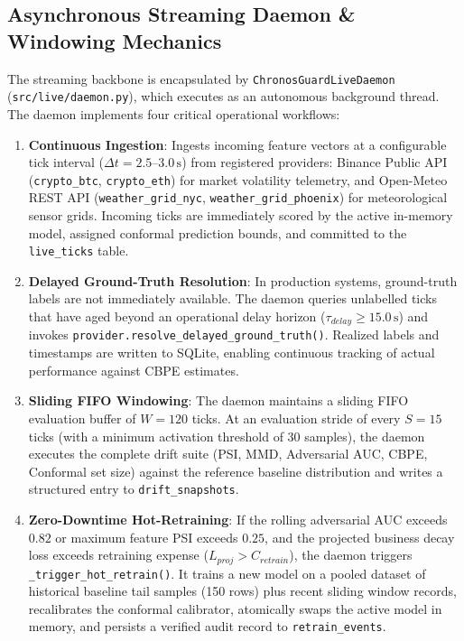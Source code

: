 \documentclass[conference]{IEEEtran}
\begin{document}
\subsection{Asynchronous Streaming Daemon \& Windowing Mechanics}
The streaming backbone is encapsulated by \texttt{ChronosGuardLiveDaemon} (\texttt{src/live/daemon.py}), which executes as an autonomous background thread. The daemon implements four critical operational workflows:
\begin{enumerate}
    \item \textbf{Continuous Ingestion}: Ingests incoming feature vectors at a configurable tick interval ($\Delta t = 2.5\text{--}3.0\,\text{s}$) from registered providers: Binance Public API (\texttt{crypto\_btc}, \texttt{crypto\_eth}) for market volatility telemetry, and Open-Meteo REST API (\texttt{weather\_grid\_nyc}, \texttt{weather\_grid\_phoenix}) for meteorological sensor grids. Incoming ticks are immediately scored by the active in-memory model, assigned conformal prediction bounds, and committed to the \texttt{live\_ticks} table.
    \item \textbf{Delayed Ground-Truth Resolution}: In production systems, ground-truth labels are not immediately available. The daemon queries unlabelled ticks that have aged beyond an operational delay horizon ($\tau_{delay} \ge 15.0\,\text{s}$) and invokes \texttt{provider.resolve\_delayed\_ground\_truth()}. Realized labels and timestamps are written to SQLite, enabling continuous tracking of actual performance against CBPE estimates.
    \item \textbf{Sliding FIFO Windowing}: The daemon maintains a sliding FIFO evaluation buffer of $W = 120$ ticks. At an evaluation stride of every $S = 15$ ticks (with a minimum activation threshold of 30 samples), the daemon executes the complete drift suite (PSI, MMD, Adversarial AUC, CBPE, Conformal set size) against the reference baseline distribution and writes a structured entry to \texttt{drift\_snapshots}.
    \item \textbf{Zero-Downtime Hot-Retraining}: If the rolling adversarial AUC exceeds $0.82$ or maximum feature PSI exceeds $0.25$, and the projected business decay loss exceeds retraining expense ($L_{proj} > C_{retrain}$), the daemon triggers \texttt{\_trigger\_hot\_retrain()}. It trains a new model on a pooled dataset of historical baseline tail samples (150 rows) plus recent sliding window records, recalibrates the conformal calibrator, atomically swaps the active model in memory, and persists a verified audit record to \texttt{retrain\_events}.
\end{enumerate}
\end{document}
